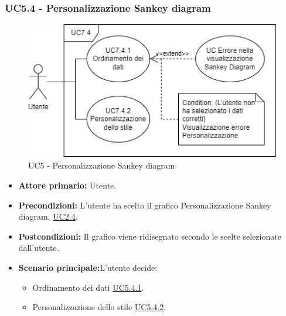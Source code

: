 \subsubsection{UC5.4 - Personalizzazione Sankey diagram}
\label{sec:UC5.4}
\begin{figure}[h!]
	\centering
	\includegraphics[scale=0.55]{../../assets/personalizzazioneSankey.drawio.png}
	\caption{UC5 - Personalizzazione Sankey diagram}
\end{figure}
\begin{itemize}
    \item \textbf{Attore primario:} Utente.
	\item \textbf{Precondizioni:} L'utente ha scelto il grafico Personalizzazione Sankey diagram. \hyperref[sec:UC2.4]{UC2.4}.
	\item \textbf{Postcondizioni:} Il grafico viene ridisegnato secondo le scelte selezionate dall'utente.
	\item \textbf{Scenario principale:}L'utente decide:
	\begin{itemize}
        \item Ordinamento dei dati \hyperref[sec:UC5.4.1]{UC5.4.1}.
        \item Personalizzazione dello stile \hyperref[sec:UC5.4.2]{UC5.4.2}.
    \end{itemize}
\end{itemize}
